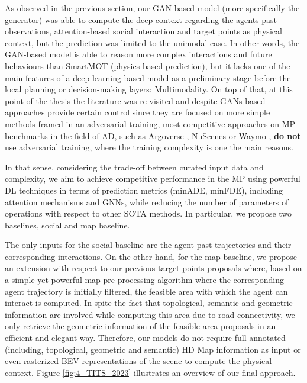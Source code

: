 As observed in the previous section, our \ac{GAN}-based model (more specifically the generator) was able to compute the deep context regarding the agents past observations, attention-based social interaction and target points as physical context, but the prediction was limited to the unimodal case. In other words, the \ac{GAN}-based model is able to reason more complex interactions and future behaviours than SmartMOT (physics-based prediction), but it lacks one of the main features of a deep learning-based model as a preliminary stage before the local planning or decision-making layers: Multimodality. On top of that, at this point of the thesis the literature was re-visited and despite \acp{GAN}-based approaches \cite{sadeghian2019sophie, dendorfer2020goal, gupta2018social, gomez2022exploring} provide certain control since they are focused on more simple methods framed in an adversarial training, most competitive approaches on \ac{MP} benchmarks in the field of \ac{AD}, such as Argoverse \cite{chang2019argoverse}, NuScenes \cite{caesar2020nuscenes} or Waymo \cite{ettinger2021large}, \textbf{do not} use adversarial training, where the training complexity is one the main reasons.

In that sense, considering the trade-off between curated input data and complexity, we aim to achieve competitive performance in the \ac{MP} using powerful DL techniques in terms of prediction metrics (\ac{minADE}, \ac{minFDE}), including attention mechanisms and \acp{GNN}, while reducing the number of parameters of operations with respect to other \ac{SOTA} methods. In particular, we propose two baselines, social and map baseline. 

The only inputs for the social baseline are the agent past trajectories and their corresponding interactions. On the other hand, for the map baseline, we propose an extension with respect to our previous target points proposals where, based on a simple-yet-powerful map pre-processing algorithm where the corresponding agent trajectory is initially filtered, the feasible area with which the agent can interact is computed. In spite the fact that topological, semantic and geometric information are involved while computing this area due to road connectivity, we only retrieve the geometric information of the feasible area proposals in an efficient and elegant way. Therefore, our models do not require full-annotated (including, topological, geometric and semantic) HD Map information as input or even rasterized \ac{BEV} representations of the scene to compute the physical context. Figure \ref{fig:4_TITS_2023} illustrates an overview of our final approach.

